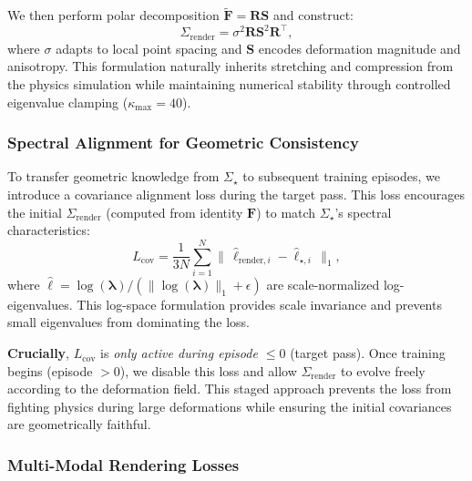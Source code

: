     We then perform polar decomposition $\tilde{\mathbf{F}}=\mathbf{R}\mathbf{S}$ and construct:
    \begin{equation}
    \label{eq:sigma_render}
    \Sigma_{\text{render}} = \sigma^2 \mathbf{R} \mathbf{S}^2 \mathbf{R}^\top,
    \end{equation}
    where $\sigma$ adapts to local point spacing and $\mathbf{S}$ encodes deformation magnitude and anisotropy. This formulation naturally inherits stretching and compression from the physics simulation while maintaining numerical stability through controlled eigenvalue clamping ($\kappa_{\max}=40$).

\subsubsection{Spectral Alignment for Geometric Consistency}

    To transfer geometric knowledge from $\Sigma_\star$ to subsequent training episodes, we introduce a covariance alignment loss during the target pass. This loss encourages the initial $\Sigma_{\text{render}}$ (computed from identity $\mathbf{F}$) to match $\Sigma_\star$'s spectral characteristics:
    \begin{equation}
    \label{eq:logspec}
    L_{\text{cov}} = \frac{1}{3N}\sum_{i=1}^N \big\|\,\hat{\ell}_{\text{render},i} - \hat{\ell}_{\star,i}\,\big\|_1,
    \end{equation}
    where $\hat{\ell} = \log(\boldsymbol{\lambda})/(\|\log(\boldsymbol{\lambda})\|_1 + \epsilon)$ are scale-normalized log-eigenvalues. This log-space formulation provides scale invariance and prevents small eigenvalues from dominating the loss.
    
    \textbf{Crucially}, $L_{\text{cov}}$ is \emph{only active during episode $\leq 0$} (target pass). Once training begins (episode $> 0$), we disable this loss and allow $\Sigma_{\text{render}}$ to evolve freely according to the deformation field. This staged approach prevents the loss from fighting physics during large deformations while ensuring the initial covariances are geometrically faithful.

\subsubsection{Multi-Modal Rendering Losses}


